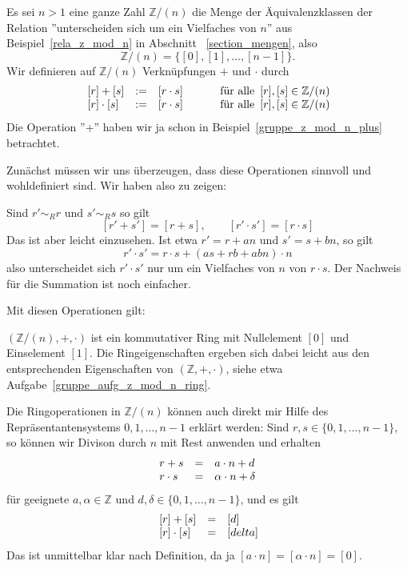 \begin{beispiel}\label{gruppe_z_mod_n} 
Es sei $n > 1$ eine ganze Zahl $\mathbb Z/ (n)$ die Menge der Äquivalenzklassen der Relation 
''unterscheiden sich um ein Vielfaches von $n$'' aus Beispiel~\ref{rela_z_mod_n} in 
Abschnitt ~\ref{section_mengen}, also 
  	$$ \mathbb Z/ (n) = \{ [0], [1], \ldots, [n-1] \}. $$
Wir definieren auf $\mathbb Z/ (n) $ Verknüpfungen $+$ und $\cdot$ durch
  	$$ \begin{array} {l c l c l}
  	\, [r] + [s] & := & [r \cdot s] & \quad & \textrm{ für alle } \, [r], [s] \in \mathbb Z/ (n) \\
  	\, [r] \cdot [s] & := & [r \cdot s ] & \quad & \textrm{ für alle } \, [r], [s] \in \mathbb Z/ (n)
  	\end{array} $$
Die Operation ''+'' haben wir ja schon in Beispiel~\ref{gruppe_z_mod_n_plus} betrachtet.

Zunächst müssen wir uns überzeugen, dass diese Operationen sinnvoll und wohldefiniert sind. Wir haben 
also zu zeigen: 

Sind $r' \sim_R r$ und $s' \sim_R s$ so gilt
  	$$ [r' + s'] = [r + s], \qquad [r' \cdot s'] = [r \cdot s] $$
Das ist aber leicht einzusehen. Ist etwa $r' = r + an$ und $s' = s + bn$, so gilt
  	$$ r' \cdot s' = r \cdot s + (as + rb + abn) \cdot n $$
also unterscheidet sich $ r' \cdot s'$ nur um ein Vielfaches von $n$ von $r \cdot s$. Der Nachweis für 
die Summation ist noch einfacher. 

Mit diesen Operationen gilt:

$(\mathbb Z/ (n), +, \cdot )$ ist ein kommutativer Ring mit Nullelement $[0]$ und Einselement $[1]$. Die 
Ringeigenschaften ergeben sich dabei leicht aus den entsprechenden Eigenschaften von $(\mathbb Z, +, \cdot )$, 
siehe etwa Aufgabe~\ref{gruppe_aufg_z_mod_n_ring}.
\end{beispiel}

\begin{notiz} Die Ringoperationen in $\mathbb Z/ (n)$ können auch direkt mir Hilfe des Repräsentantensystems 
$0, 1, \ldots, n-1$ erklärt werden: Sind $r, s \in \{0, 1, \ldots , n-1 \}$, so können wir 
Divison durch $n$ mit Rest anwenden und erhalten
  	$$ \begin{array} {l c l}
  	r + s & = & a \cdot n + d \\
  	r \cdot s & = & \alpha \cdot n + \delta 
  	\end{array} $$
für geeignete $a, \alpha \in \mathbb Z$ und $d , \delta \in \{0, 1, \ldots, n-1 \}$, und es gilt
  	$$ \begin{array} {l c l}
  	\, [r] + [s] & = &  [d] \\
  	\, [r] \cdot [s] & = & [delta]
  	\end{array} $$
Das ist unmittelbar klar nach Definition, da ja $[a \cdot n] = [\alpha \cdot n] = [0]$. 
\end{notiz}

